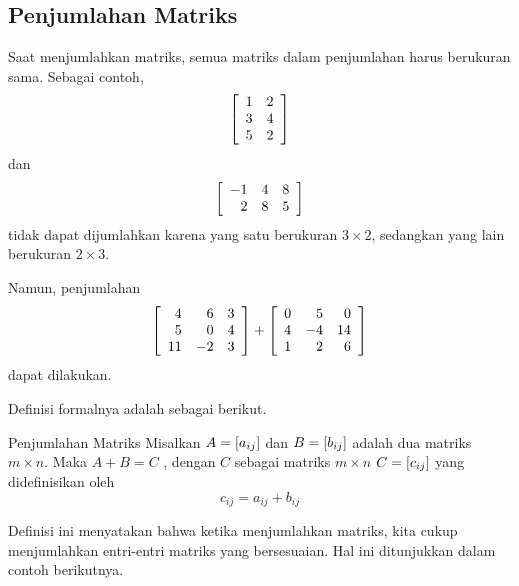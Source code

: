 \subsection{Penjumlahan Matriks}

Saat menjumlahkan matriks, semua matriks dalam penjumlahan harus berukuran sama.
Sebagai contoh,
\begin{equation*}
\left[
\begin{array}{rr}
1 & 2 \\
3 & 4 \\
5 & 2
\end{array}
\right] 
\end{equation*}
dan
\begin{equation*}
\left[
\begin{array}{rrr}
-1 & 4 & 8\\
2 & 8 & 5
\end{array}
\right] 
\end{equation*}
tidak dapat dijumlahkan karena yang satu berukuran $3 \times 2$, sedangkan yang lain berukuran $2 \times 3$.

Namun, penjumlahan
\begin{equation*}
\left[
\begin{array}{rrr}
4 & 6 & 3\\
5 & 0 & 4\\
11 & -2 & 3
\end{array}
\right] 
+
\left[
\begin{array}{rrr}
0 & 5 & 0 \\
4 & -4 & 14 \\
1 & 2 & 6
\end{array}
\right]
\end{equation*}
dapat dilakukan.

Definisi formalnya adalah sebagai berikut.

\begin{definition}{Penjumlahan Matriks}\label{def:additionofmatrices}
Misalkan $A=\left[ a_{ij}\right] $ dan $B=\left[ b_{ij}\right] $ adalah dua
matriks $m\times n$. Maka $A+B=C$ , dengan $C$ sebagai matriks $m \times n$
$C=\left[ c_{ij}\right]$ yang didefinisikan oleh
\begin{equation*}
c_{ij}=a_{ij}+b_{ij}
\end{equation*}

\end{definition}

Definisi ini menyatakan bahwa ketika menjumlahkan matriks, kita cukup menjumlahkan entri-entri matriks yang bersesuaian.
Hal ini ditunjukkan dalam contoh berikutnya. 

